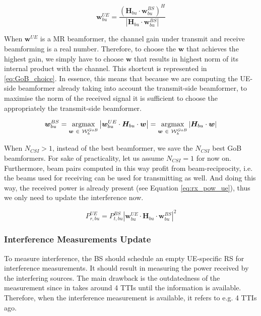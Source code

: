 \begin{equation} \label{eq:GoB_choice_ue}
    \bm{w}^{UE}_{bu} = \frac{\left(\bm{H}_{bu} \cdot \bm{w}^{BS}_{bu}\right)^H}{\left|\bm{H}_{bu} \cdot \bm{w}^{BS}_{bu}\right|}
\end{equation}


When $\bm{w}^{UE}$ is a MR beamformer, the channel gain under transmit and receive beamforming is a real number. Therefore, to choose the $\bm{w}$ that achieves the highest gain, we simply have to choose $\bm{w}$ that results in highest norm of its internal product with the channel. This shortcut is represented in \eqref{eq:GoB_choice}. In essence, this means that because we are computing the UE-side beamformer already taking into account the transmit-side beamformer, to maximise the norm of the received signal it is sufficient to choose the appropriately the transmit-side beamformer. 

\begin{equation} \label{eq:GoB_choice}
    \bm{w}^{BS}_{bu} = \operatorname*{argmax}_{\bm{w} \ \in \ \mathcal{W}^{GoB}_b} \left| \bm{w}^{UE}_{bu} \cdot \bm{H}_{bu} \cdot \bm{w} \right| = \operatorname*{argmax}_{\bm{w} \ \in \ \mathcal{W}^{GoB}_b} \left| \bm{H}_{bu} \cdot \bm{w}\right|
\end{equation}

When $N_{CSI} > 1$, instead of the best beamformer, we save the $N_{CSI}$ best GoB beamformers. For sake of practicality, let us assume $N_{CSI} = 1$ for now on. Furthermore, beam pairs computed in this way profit from beam-reciprocity, i.e. the beams used for receiving can be used for transmitting as well. And doing this way, the received power is already present (see Equation \eqref{eq:rx_pow_ue}), thus we only need to update the interference now.

\begin{equation} \label{eq:rx_pow_ue}
    P_{r, bu}^{UE} = P_{t, bu}^{BS} \left| \bm{w}^{UE}_{bu} \cdot \bm{H}_{bu} \cdot \bm{w}^{BS}_{bu} \right|^2 
\end{equation}


\subsubsection*{Interference Measurements Update}

To measure interference, the \ac{BS} should schedule an empty UE-specific \acs{RS} for interference measurements. It should result in measuring the power received by the interfering sources. The main drawback is the outdatedness of the measurement since in takes around 4 TTIs until the information is available. Therefore, when the interference measurement is available, it refers to e.g. 4 TTIs ago. 


